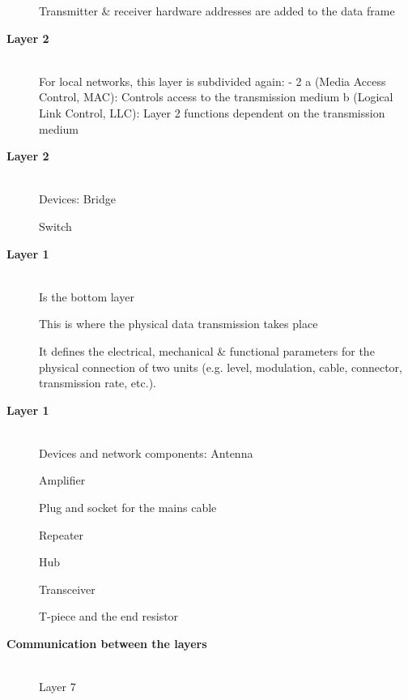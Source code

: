 \begin{description}
  \ite Transmitter \& receiver hardware addresses are added to the data frame

\ei


\os{\newpage}\item[{\rot\bf  Layer 2 }]~\\[-3ex]

\bi
  \ite For local networks, this layer is subdivided again: - 2 a (Media Access Control, MAC): Controls access to the transmission medium
\ei
\bi
  b (Logical Link Control, LLC): Layer 2 functions dependent on the transmission medium
 \ei



\os{\newpage}\item[{\rot\bf  Layer 2 }]~\\[-3ex]

\bi
  \ite Devices:
\ei
\bi
 \ite Bridge
 \ei


Switch


\os{\newpage}\item[{\rot\bf  Layer 1 }]~\\[-3ex]

\bi
  \ite Is the bottom layer

  \ite This is where the physical data transmission takes place

  \ite It defines the electrical, mechanical \& functional parameters for the physical connection of two units (e.g. level, modulation, cable, connector, transmission rate, etc.).

\ei


\os{\newpage}\item[{\rot\bf  Layer 1 }]~\\[-3ex]

\bi
  \ite Devices and network components:
\ei
\bi
 \ite Antenna
 \ei

\bi
 \ite Amplifier
 \ei

\bi
 \ite Plug and socket for the mains cable
 \ei

\bi
 \ite Repeater
 \ei

\bi
 \ite $\mathrm{Hub}$
 \ei

\bi
 \ite Transceiver
 \ei

\bi
 \ite T-piece and the end resistor
 \ei



\os{\newpage}\item[{\rot\bf  Communication between the layers }]~\\[-3ex]

Layer 7


\end{description}
